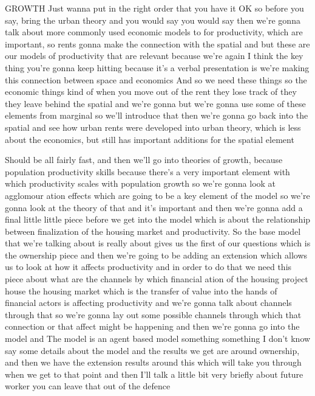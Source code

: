 GROWTH
Just wanna put in the right order that you have it OK so before you say, bring the urban theory and you would say you would say then we’re gonna talk about more commonly used economic models to for productivity, which are important, so rents gonna make the connection with the spatial and but these are our models of productivity that are relevant because we’re again I think the key thing you’re gonna keep hitting because it’s a verbal presentation is we’re making this connection between space and economics And so we need these things so the economic things kind of when you move out of the rent they lose track of they they leave behind the spatial and we’re gonna but we’re gonna use some of these elements from marginal so we’ll introduce that then we’re gonna go back into the spatial and see how urban rents were developed into urban theory, which is less about the economics, but still has important additions for the spatial element

Should be all fairly fast, and then we’ll go into theories of growth, because population productivity skills because there’s a very important element with which productivity scales with population growth so we’re gonna look at agglomour ation effects which are going to be a key element of the model so we’re gonna look at the theory of that and it’s important and then we’re gonna add a final little little piece before we get into the model which is about the relationship between finalization of the housing market and productivity. So the base model that we’re talking about is really about gives us the first of our questions which is the ownership piece and then we’re going to be adding an extension which allows us to look at how it affects productivity and in order to do that we need this piece about what are the channels by which financial ation of the housing project house the housing market which is the transfer of value into the hands of financial actors is affecting productivity and we’re gonna talk about channels through that so we’re gonna lay out some possible channels through which that connection or that affect might be happening and then we’re gonna go into the model and The model is an agent based model something something I don’t know say some details about the model and the results we get are around ownership, and then we have the extension results around this which will take you through when we get to that point and then I’ll talk a little bit very briefly about future worker you can leave that out of the defence

